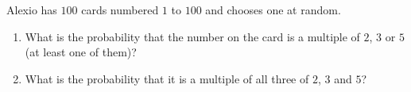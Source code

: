 Alexio has $100$ cards numbered $1$ to $100$ and chooses one at random.
\begin{enumerate}
\item[(a)] What is the probability that the number on the card is a multiple of $2$, $3$ or $5$ (at least one of them)?
\item[(b)] What is the probability that it is a multiple of all three of $2$, $3$ and $5$?
\end{enumerate}
